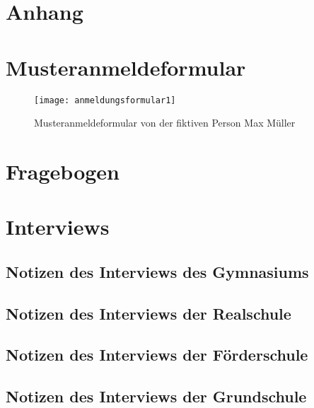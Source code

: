 
\newpage
\section{Anhang}
\appendix
{} %

\section{Musteranmeldeformular}
\label{section-Musteranmeldeformular}
\begin{figure}[H]
    \centering
    \caption{Musteranmeldeformular von der fiktiven Person Max Müller}
    \begin{adjustbox}{height=0.85\textheight, center}
        \texttt{[image: anmeldungsformular1]}
    \end{adjustbox}
    \label{fig:anmeldeformular}
\end{figure}

\section{Fragebogen}
\label{section-fragebogen}


\section{Interviews}
\subsection{Notizen des Interviews des Gymnasiums}
\label{section-InterviewGymnasium}


\subsection{Notizen des Interviews der Realschule}
\label{section-InterviewRealschule}


\subsection{Notizen des Interviews der Förderschule}
\label{section-InterviewFoerderschule}


\subsection{Notizen des Interviews der Grundschule}
\label{section-InterviewGrundschule}


